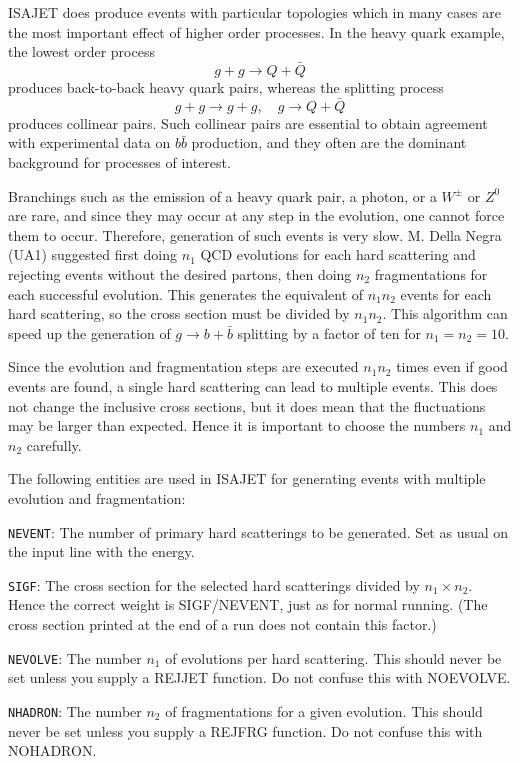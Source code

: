        ISAJET does produce events with particular topologies which
in many cases are the most important effect of higher order processes.
In the heavy quark example, the lowest order process
$$
g + g \to Q + \bar Q
$$
produces back-to-back heavy quark pairs, whereas the splitting process
$$      
g + g \to g + g, \quad g \to Q + \bar Q
$$
produces collinear pairs. Such collinear pairs are essential to obtain
agreement with experimental data on $b \bar b$ production, and they
often are the dominant background for processes of interest.

      Branchings such as the emission of a heavy quark pair, a photon,
or a $W^\pm$ or $Z^0$ are rare, and since they may occur at any step
in the evolution, one cannot force them to occur. Therefore,
generation of such events is very slow. M. Della Negra (UA1) suggested
first doing $n_1$ QCD evolutions for each hard scattering and
rejecting events without the desired partons, then doing $n_2$
fragmentations for each successful evolution. This generates the
equivalent of $n_1 n_2$ events for each hard scattering, so the cross
section must be divided by $n_1 n_2$. This algorithm can speed up the
generation of $g \to b + \bar b$ splitting by a factor of ten for $n_1
= n_2 = 10$.

      Since the evolution and fragmentation steps are executed $n_1n_2$
times even if good events are found, a single hard scattering can lead
to multiple events. This does not change the inclusive cross sections,
but it does mean that the fluctuations may be larger than expected.
Hence it is important to choose the numbers $n_1$ and $n_2$ carefully.

      The following entities are used in ISAJET for generating events 
with multiple evolution and fragmentation:

      \verb|NEVENT|: The number of primary hard scatterings to be
generated. Set as usual on the input line with the energy.

       \verb|SIGF|: The cross section for the selected hard
scatterings divided by $n_1 \times n_2$. Hence the correct weight is
SIGF/NEVENT, just as for normal running. (The cross section printed at
the end of a run does not contain this factor.)

       \verb|NEVOLVE|: The number $n_1$ of evolutions per hard
scattering. This should never be set unless you supply a REJJET
function. Do not confuse this with NOEVOLVE.

       \verb|NHADRON|: The number $n_2$ of fragmentations for a given
evolution. This should never be set unless you supply a REJFRG
function. Do not confuse this with NOHADRON.

